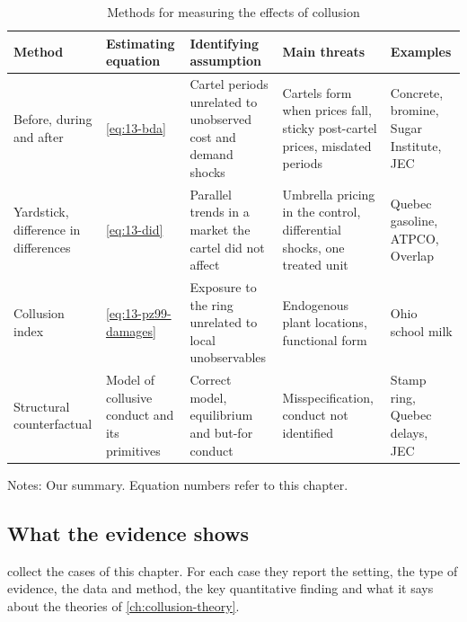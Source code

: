 \begin{table}[htbp]
\centering
\caption{Methods for measuring the effects of collusion}\label{tab:13-damage-methods}
\footnotesize
\begin{tabularx}{\textwidth}{@{}>{\raggedright\arraybackslash}p{2.3cm}>{\raggedright\arraybackslash}p{3.3cm}>{\raggedright\arraybackslash}X>{\raggedright\arraybackslash}X>{\raggedright\arraybackslash}p{2.6cm}@{}}
\toprule
Method & Estimating equation & Identifying assumption & Main threats & Examples\\
\midrule
Before, during and after & \eqref{eq:13-bda} & Cartel periods unrelated to unobserved cost and demand shocks & Cartels form
when prices fall, sticky post-cartel prices, misdated periods & Concrete, bromine, Sugar Institute, JEC\\
\addlinespace
Yardstick, difference in differences & \eqref{eq:13-did} & Parallel trends in a market the cartel did not affect &
Umbrella pricing in the control, differential shocks, one treated unit & Quebec gasoline, ATPCO, Overlap\\
\addlinespace
Collusion index & \eqref{eq:13-pz99-damages} & Exposure to the ring unrelated to local unobservables & Endogenous
plant locations, functional form & Ohio school milk\\
\addlinespace
Structural counterfactual & Model of collusive conduct and its primitives & Correct model, equilibrium and but-for
conduct & Misspecification, conduct not identified & Stamp ring, Quebec delays, JEC\\
\bottomrule
\end{tabularx}

\smallskip
\begin{minipage}{0.95\textwidth}\footnotesize
Notes: Our summary. Equation numbers refer to this chapter.
\end{minipage}
\end{table}

\subsection{What the evidence shows}\label{sec:13-synthesis}

 collect the cases of this chapter. For each case they report the setting,
the type of evidence, the data and method, the key quantitative finding and what it says about the theories of
\cref{ch:collusion-theory}.

